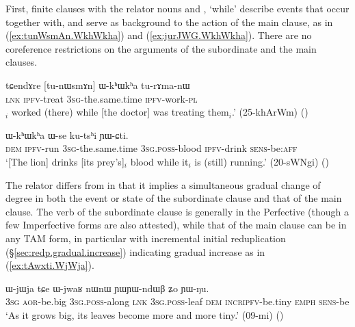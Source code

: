  First, finite clauses with the relator nouns   and , `while' describe events that occur together with, and serve as background to the action of the main clause, as in (\ref{ex:tunWsmAn.WkhWkha}) and (\ref{ex:jurJWG.WkhWkha}).  There are no coreference restrictions on the arguments of the subordinate and the main clauses.

\begin{exe}
\ex \label{ex:tunWsmAn.WkhWkha}
\gll tɕendɤre [tu-nɯsmɤn] ɯ-kʰɯkʰa tu-rɤma-nɯ  \\
\textsc{lnk} \textsc{ipfv}-treat \textsc{3sg}-the.same.time \textsc{ipfv}-work-\textsc{pl} \\
$_i$ worked (there) while [the doctor] was treating them$_i$.' (25-khArWm)
()
\end{exe}

\begin{exe}
\ex \label{ex:jurJWG.WkhWkha}
 ɯ-kʰɯkʰa ɯ-se ku-tsʰi ɲɯ-ɕti.  \\
\textsc{dem} \textsc{ipfv}-run \textsc{3sg}-the.same.time \textsc{3sg}.\textsc{poss}-blood \textsc{ipfv}-drink  \textsc{sens}-be:\textsc{aff} \\
\glt `[The lion] drinks [its prey's]$_i$ blood while it$_i$ is (still) running.' (20-sWNgi)
()
\end{exe}

The relator  differs from  in that it implies a simultaneous gradual change of degree in both the event or state of the subordinate clause and that of the main clause. The verb of the subordinate clause is generally in the Perfective (though a few Imperfective forms are also attested), while that of the main clause can be in any TAM form, in particular with incremental initial reduplication (§\ref{sec:redp.gradual.increase}) indicating gradual increase as in (\ref{ex:tAwxti.WjWja}).

\begin{exe}
\ex \label{ex:tAwxti.WjWja}
 ɯ-jɯja tɕe ɯ-jwaʁ nɯnɯ ɲɯ\redp{}ɲɯ-ndɯβ ʑo ɲɯ-ŋu.  	\\
\textsc{3sg} \textsc{aor}-be.big  \textsc{3sg}.\textsc{poss}-along \textsc{lnk} \textsc{3sg}.\textsc{poss}-leaf \textsc{dem} \textsc{incr\redp{}ipfv}-be.tiny \textsc{emph} \textsc{sens}-be \\
\glt `As it grows big, its leaves become more and more tiny.' (09-mi)
()
\end{exe}

